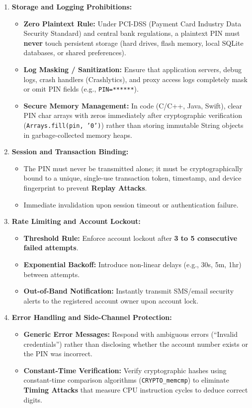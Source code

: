 \begin{enumerate}
\item \textbf{Storage and Logging Prohibitions:}
\begin{itemize}
\item \textbf{Zero Plaintext Rule:} Under PCI-DSS (Payment Card Industry Data Security Standard) and central bank regulations, a plaintext PIN must \textbf{never} touch persistent storage (hard drives, flash memory, local SQLite databases, or shared preferences).
\item \textbf{Log Masking / Sanitization:} Ensure that application servers, debug logs, crash handlers (Crashlytics), and proxy access logs completely mask or omit PIN fields (e.g., \texttt{PIN=******}).
\item \textbf{Secure Memory Management:} In code (C/C++, Java, Swift), clear PIN char arrays with zeros immediately after cryptographic verification (\texttt{Arrays.fill(pin, '0')}) rather than storing immutable String objects in garbage-collected memory heaps.
\end{itemize}

\item \textbf{Session and Transaction Binding:}
\begin{itemize}
\item The PIN must never be transmitted alone; it must be cryptographically bound to a unique, single-use transaction token, timestamp, and device fingerprint to prevent \textbf{Replay Attacks}.
\item Immediate invalidation upon session timeout or authentication failure.
\end{itemize}

\item \textbf{Rate Limiting and Account Lockout:}
\begin{itemize}
\item \textbf{Threshold Rule:} Enforce account lockout after \textbf{3 to 5 consecutive failed attempts}.
\item \textbf{Exponential Backoff:} Introduce non-linear delays (e.g., 30s, 5m, 1hr) between attempts.
\item \textbf{Out-of-Band Notification:} Instantly transmit SMS/email security alerts to the registered account owner upon account lock.
\end{itemize}

\item \textbf{Error Handling and Side-Channel Protection:}
\begin{itemize}
\item \textbf{Generic Error Messages:} Respond with ambiguous errors (``Invalid credentials'') rather than disclosing whether the account number exists or the PIN was incorrect.
\item \textbf{Constant-Time Verification:} Verify cryptographic hashes using constant-time comparison algorithms (\texttt{CRYPTO\_memcmp}) to eliminate \textbf{Timing Attacks} that measure CPU instruction cycles to deduce correct digits.
\end{itemize}
\end{enumerate}

